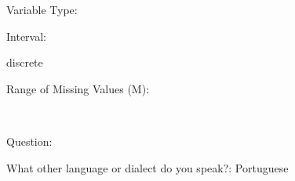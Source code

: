 \documentclass[
]{article}
\begin{document}
\begin{minipage}[t]{0.3\linewidth}

Variable Type:

\end{minipage}%
\begin{minipage}[t]{0.7\linewidth}

\end{minipage}

\begin{minipage}[t]{0.3\linewidth}

Interval:

\end{minipage}%
\begin{minipage}[t]{0.7\linewidth}

discrete

\end{minipage}

\begin{minipage}[t]{0.3\linewidth}

Range of Missing Values (M):

\end{minipage}%
\begin{minipage}[t]{0.7\linewidth}

~

\end{minipage}

\begin{minipage}[t]{0.3\linewidth}

Question:

\end{minipage}%
\begin{minipage}[t]{0.7\linewidth}

What other language or dialect do you speak?: Portuguese

\end{minipage}
\end{document}
